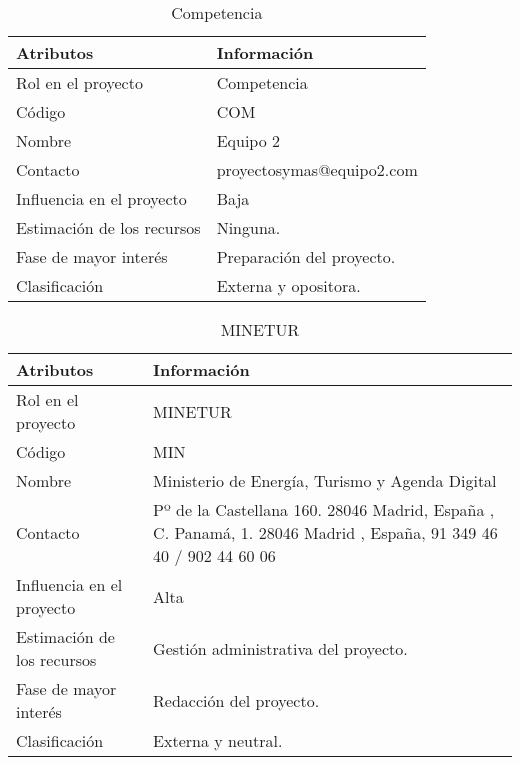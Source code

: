 \begin{table}[H]
\centering
\begin{tabular}{|m{5cm}|m{11cm}| }
\hline
\rowcolor{gray!50} \centering Atributos & Información  \\
\hline
\hline
 Rol en el proyecto & Competencia \\
 \hline
 Código & COM \\
 \hline
 Nombre & Equipo 2 \\
\hline
 Contacto & proyectosymas@equipo2.com \\
\hline
 Influencia en el proyecto & Baja \\
\hline
 Estimación de los recursos & Ninguna. \\
\hline
 Fase de mayor interés & Preparación del proyecto.\\
\hline
Clasificación & Externa y opositora.\\
 \hline
\end{tabular}
\caption{Competencia}
\label{table:ta1}
\end{table}
\begin{table}[H]
\centering
\begin{tabular}{|m{5cm}|m{11cm}| }
\hline
\rowcolor{gray!50} \centering Atributos & Información  \\
\hline
\hline
 Rol en el proyecto & MINETUR \\
 \hline
 Código & MIN \\
 \hline
 Nombre &  Ministerio de Energía, Turismo y Agenda Digital \\
\hline
 Contacto & Pº de la Castellana 160. 28046 Madrid, España , C. Panamá, 1. 28046 Madrid , España, 91 349 46 40 / 902 44 60 06\\
\hline
 Influencia en el proyecto & Alta \\
\hline
 Estimación de los recursos & Gestión administrativa del proyecto. \\
\hline
 Fase de mayor interés & Redacción del proyecto.\\
\hline
Clasificación & Externa y neutral.\\
 \hline
\end{tabular}
\caption{MINETUR}
\label{table:ta1}
\end{table}
